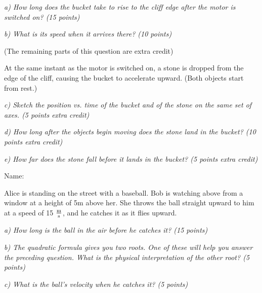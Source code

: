 \documentclass[12pt]{article}
\begin{document}
\it{a) How long does the bucket take to rise to the cliff edge after the motor is switched on? (15 points)}

\vspace{1in}

\it{b) What is its speed when it arrives there? (10 points})

\vspace{1in}

\rm \centerline{(The remaining parts of this question are extra credit)}

At the same instant as the motor is switched on, a stone is dropped from the edge of the cliff, causing the bucket to accelerate upward. (Both objects start from rest.)

\bigskip

\it{c) Sketch the position vs. time of the bucket and of the stone on the same set of axes. (5 points extra credit)}

\vspace{1in}

\it{d) How long after the objects begin moving does the stone land in the bucket? (10 points extra credit)}

\vspace{1in}

\it{e) How far does the stone fall before it lands in the bucket? (5 points extra credit)}

\newpage

\begin{flushright}
    Name: \underline{\hspace{3in}}
  \end{flushright}

  \Large \centerline{}
  \normalsize
\rm
Alice is standing on the street with a baseball. Bob is watching above from a window at a height of 5m above her. She throws the ball straight upward to him at
a speed of 15 $\frac{\rm m}{\rm s}$, and he catches it as it flies upward.

\bigskip

\it{a) How long is the ball in the air before he catches it? (15 points)}

\vspace{3in}

\it{b) The quadratic formula gives you two roots. One of these will help you answer the preceding question. What is the physical interpretation of the other root? (5 points)}
\vspace{1in}

\it{c) What is the ball's velocity when he catches it? (5 points)}
\end{document}
